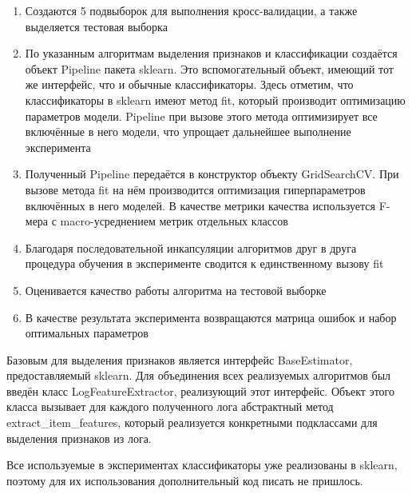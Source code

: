 \begin{enumerate}
\item Создаются 5 подвыборок для выполнения кросс-валидации, а также выделяется тестовая выборка
\item По указанным алгоритмам выделения признаков и классификации создаётся объект Pipeline пакета sklearn. Это вспомогательный объект, имеющий тот же интерфейс, что и обычные классификаторы. Здесь отметим, что классификаторы в sklearn имеют метод fit, который производит оптимизацию параметров модели. Pipeline при вызове этого метода оптимизирует все включённые в него модели, что упрощает дальнейшее выполнение эксперимента
\item Полученный Pipeline передаётся в конструктор объекту GridSearchCV. При вызове метода fit на нём производится оптимизация гиперпараметров включённых в него моделей. В качестве метрики качества используется F-мера с macro-усреднением метрик отдельных классов
\item Благодаря последовательной инкапсуляции алгоритмов друг в друга процедура обучения в эксперименте сводится к единственному вызову fit
\item Оценивается качество работы алгоритма на тестовой выборке
\item В качестве результата эксперимента возвращаются матрица ошибок и набор оптимальных параметров
\end{enumerate}

Базовым для выделения признаков является интерфейс BaseEstimator, предоставляемый sklearn. Для объединения всех реализуемых алгоритмов был введён класс LogFeatureExtractor, реализующий этот интерфейс. Объект этого класса вызывает для каждого полученного лога абстрактный метод extract\_item\_features, который реализуется конкретными подклассами для выделения признаков из лога. 

Все используемые в экспериментах классификаторы уже реализованы в sklearn, поэтому для их использования дополнительный код писать не пришлось. 

